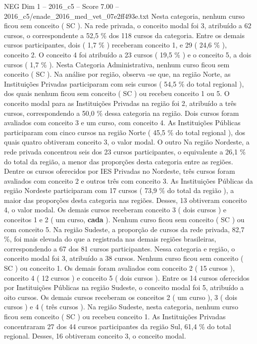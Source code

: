 \begin{textsample}{NEG Dim 1 – 2016\_c5 – Score 7.00 – 2016\_c5/enade\_2016\_med\_vet\_07e2ff493e.txt}
Nesta categoria, nenhum curso ficou sem conceito ( SC ).
Na rede privada, o conceito modal foi 3, atribuído a 62 cursos, o correspondente a 52,5 \% dos 118 cursos da categoria.
Entre os demais cursos participantes, dois ( 1,7 \% ) receberam conceito 1, e 29 ( 24,6 \% ), conceito 2.
O conceito 4 foi atribuído a 23 cursos ( 19,5 \% ) e o conceito 5, a dois cursos ( 1,7 \% ).
Nesta Categoria Administrativa, nenhum curso ficou sem conceito ( SC ).
Na análise por região, observa -se que, na região Norte, as Instituições Privadas participaram com seis cursos ( 54,5 \% do total regional ), dos quais nenhum ficou sem conceito ( SC ) ou recebeu conceito 1 ou 5.
O conceito modal para as Instituições Privadas na região foi 2, atribuído a três cursos, correspondendo a 50,0 \% dessa categoria na região.
Dois cursos foram avaliados com conceito 3 e um curso, com conceito 4.
As Instituições Públicas participaram com cinco cursos na região Norte ( 45,5 \% do total regional ), dos quais quatro obtiveram conceito 3, o valor modal.
O outro Na região Nordeste, a rede privada concentrou seis dos 23 cursos participantes, o equivalente a 26,1 \% do total da região, a menor das proporções desta categoria entre as regiões.
Dentre os cursos oferecidos por IES Privadas no Nordeste, três cursos foram avaliados com conceito 2 e outros três com conceito 3.
As Instituições Públicas da região Nordeste participaram com 17 cursos ( 73,9 \% do total da região ), a maior das proporções desta categoria nas regiões.
Desses, 13 obtiveram conceito 4, o valor modal.
Os demais cursos receberam conceito 3 ( dois cursos ) e conceitos 1 e 2 ( um curso, \textbf{cada} ).
Nenhum curso ficou sem conceito ( SC ) ou com conceito 5.
Na região Sudeste, a proporção de cursos da rede privada, 82,7 \%, foi mais elevada do que a registrada nas demais regiões brasileiras, correspondendo a 67 dos 81 cursos participantes.
Nessa categoria e região, o conceito modal foi 3, atribuído a 38 cursos.
Nenhum curso ficou sem conceito ( SC ) ou conceito 1.
Os demais foram avaliados com conceito 2 ( 15 cursos ), conceito 4 ( 12 cursos ) e conceito 5 ( dois cursos ).
Entre os 14 cursos oferecidos por Instituições Públicas na região Sudeste, o conceito modal foi 5, atribuído a oito cursos.
Os demais cursos receberam os conceitos 2 ( um curso ), 3 ( dois cursos ) e 4 ( três cursos ).
Na região Sudeste, nesta categoria, nenhum curso ficou sem conceito ( SC ) ou recebeu conceito 1.
As Instituições Privadas concentraram 27 dos 44 cursos participantes da região Sul, 61,4 \% do total regional.
Desses, 16 obtiveram conceito 3, o conceito modal.

\end{textsample}
